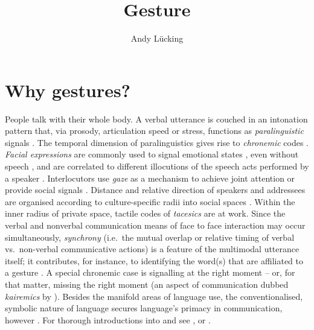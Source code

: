 \documentclass[output=paper
 	        ,biblatex
                ,babelshorthands
                ,newtxmath
                ,draftmode
                ,colorlinks, citecolor=brown
]{langscibook}
\author{Andy Lücking\affiliation{Universit\'{e} de Paris, Goethe-Universität Frankfurt}}
\title{Gesture}
\begin{document}
\maketitle
\label{chap-gesture}


\section{Why gestures?} 
\label{sec:why-gestures}

People talk with their whole body. 
%
A verbal utterance is couched in an intonation pattern that, via prosody, articulation speed or stress, functions as \emph{paralinguistic} signals \citep[e.g.][]{Birdwhistell:1970}. 
%
The temporal dimension of paralinguistics gives rise to \emph{chronemic} codes \citep{Poyatos:1975,Bruneau:1980}. \emph{Facial expressions} are commonly used to signal emotional states \citep{Ekman:Friesen:1978}, even without speech \citep{Argyle:1975}, and are correlated to different illocutions of the speech acts performed by a speaker \citep{Domaneschi:Passarelli:Chiorri:2017}.
%
Interlocutors use \emph{gaze} as a mechanism to achieve joint attention \citep{Argyle:Cook:1976} or provide social signals \citep{Kendon:1967}. 
%
Distance and relative direction of speakers and addressees are organised according to culture-specific radii into social spaces \citep[\emph{proxemics},][]{Hall:1968}. 
%
Within the inner radius of private space, tactile codes of \emph{tacesics} \citep{Kauffman:1971} are at work. 
%
Since the verbal and nonverbal communication means of face to face interaction may occur simultaneously, \emph{synchrony} (i.e.\ the mutual overlap or relative timing of verbal vs.\ non-verbal communicative actions) is a feature of the multimodal utterance itself; it contributes, for instance, to identifying the word(s) that are affiliated to a gesture \citep{Wiltshire:2007}. 
%
A special chronemic case is signalling at the right moment -- or, for that matter, missing the right moment (an aspect of communication dubbed \emph{kairemics} by \citealp[]{Luecking:Pfeiffer:2012}).
%
Besides the manifold areas of language use, the conventionalised, symbolic nature of language secures language's primacy in communication, however \citep{de:Ruiter:2004}.
%
For thorough introductions into  and  see \citet{Noeth:1990}, \citet{Posner:Robering:Sebeok:1997:2004} or \citet{Mueller:Cienki:Fricke:Ladewig:McNeill:Tessendorf:2013,Mueller:Cienki:Fricke:Ladewig:McNeill:Bressem:2014}.
\end{document}
